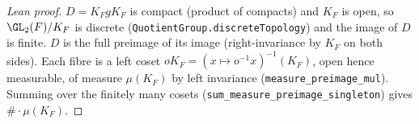 \begin{proof}[Lean proof]
$D=K_FgK_F$ is compact (product of compacts) and $K_F$ is open, so $\GL_2(F)/K_F$ is discrete (\texttt{QuotientGroup.discreteTopology}) and the image of $D$ is finite. $D$ is the full preimage of its image (right-invariance by $K_F$ on both sides). Each fibre is a left coset $oK_F=(x\mapsto o^{-1}x)^{-1}(K_F)$, open hence measurable, of measure $\mu(K_F)$ by left invariance (\texttt{measure\_preimage\_mul}). Summing over the finitely many cosets (\texttt{sum\_measure\_preimage\_singleton}) gives $\#\cdot\mu(K_F)$.
\end{proof}

\begin{corollary}
\end{corollary}
